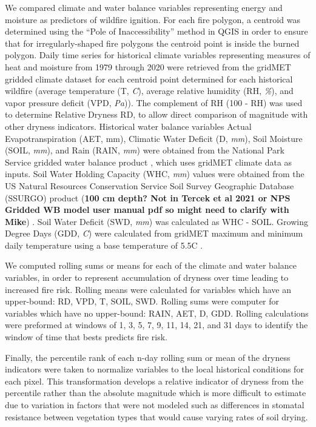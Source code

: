 \documentclass[11pt]{article}
\begin{document}
We compared climate and water balance variables representing energy and moisture as predictors of wildfire ignition. For each fire polygon, a centroid was determined using the ``Pole of Inaccessibility'' method in QGIS \citep{QGIS_software} in order to ensure that for irregularly-shaped fire polygons the centroid point is inside the burned polygon. Daily time series for historical climate variables representing measures of heat and moisture from 1979 through 2020 were retrieved from the gridMET gridded climate dataset \citep{abatzoglouDevelopmentGriddedSurface2013} for each centroid point determined for each historical wildfire (average temperature (T, \textit{\degree C}), average relative humidity (RH, \textit{\%}), and vapor pressure deficit (VPD, \textit{Pa})).  The complement of RH (100 - RH) was used to determine Relative Dryness RD, to allow direct comparison of magnitude with other dryness indicators. Historical water balance variables Actual Evapotranspiration (AET, mm), Climatic Water Deficit (D, \textit{mm}), Soil Moisture (SOIL, \textit{mm}), and Rain (RAIN, \textit{mm}) were obtained from the National Park Service gridded water balance product \citep{tercekHistoricalChangesPlant2021}, which uses gridMET climate data as inputs. Soil Water Holding Capacity (WHC, \textit{mm}) values were obtained from the US Natural Resources Conservation Service 
Soil Survey Geographic Database (SSURGO) product (\textbf{100 cm depth?  Not in Tercek et al 2021 or NPS Gridded WB model user manual pdf so might need to clarify with Mike}) \citep{naturalresourcesconservationserviceSoilSurveyGeographic2015}. Soil Water Deficit (SWD, \textit{mm}) was calculated as WHC - SOIL.  Growing Degree Days (GDD, \textit{\degree C}) were calculated from gridMET maximum and minimum daily temperature using a base temperature of 5.5\degree C \citep{mcmasterGrowingDegreedaysOne1997}.  

We computed rolling sums or means for each of the climate and water balance variables, in order to represent accumulation of dryness over time leading to increased fire risk.  Rolling means were calculated for variables which have an upper-bound: RD, VPD, T, SOIL, SWD. Rolling sums were computer for variables which have no upper-bound: RAIN, AET, D, GDD.  Rolling calculations were preformed at windows of 1, 3, 5, 7, 9, 11, 14, 21, and 31 days to identify the window of time that bests predicts fire risk.

Finally, the percentile rank of each n-day rolling sum or mean of the dryness indicators were taken to normalize variables to the local historical conditions for each pixel.  This transformation develops a relative indicator of dryness from the percentile rather than the absolute magnitude which is more difficult to estimate due to variation in factors that were not modeled such as differences in stomatal resistance between vegetation types that would cause varying rates of soil drying. 
\end{document}
